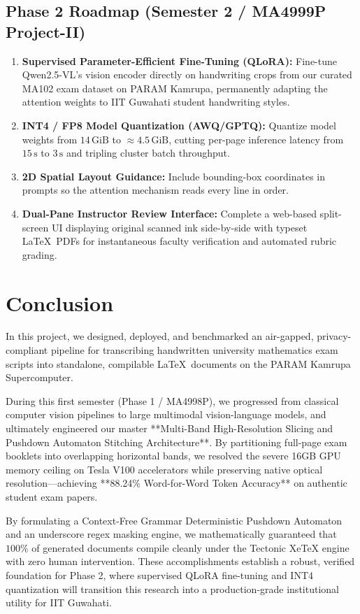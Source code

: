 \subsection{Phase 2 Roadmap (Semester 2 / MA4999P Project-II)}
\begin{enumerate}
    \item \textbf{Supervised Parameter-Efficient Fine-Tuning (QLoRA):} Fine-tune Qwen2.5-VL's vision encoder directly on handwriting crops from our curated MA102 exam dataset on PARAM Kamrupa, permanently adapting the attention weights to IIT Guwahati student handwriting styles.
    \item \textbf{INT4 / FP8 Model Quantization (AWQ/GPTQ):} Quantize model weights from $14\,\text{GiB}$ to $\approx 4.5\,\text{GiB}$, cutting per-page inference latency from $15\,\text{s}$ to $3\,\text{s}$ and tripling cluster batch throughput.
    \item \textbf{2D Spatial Layout Guidance:} Include bounding-box coordinates in prompts so the attention mechanism reads every line in order.
    \item \textbf{Dual-Pane Instructor Review Interface:} Complete a web-based split-screen UI displaying original scanned ink side-by-side with typeset \LaTeX\ PDFs for instantaneous faculty verification and automated rubric grading.
\end{enumerate}

\section{Conclusion}
\label{sec:conclusion}

In this project, we designed, deployed, and benchmarked an air-gapped, privacy-compliant pipeline for transcribing handwritten university mathematics exam scripts into standalone, compilable \LaTeX\ documents on the PARAM Kamrupa Supercomputer.

During this first semester (Phase 1 / MA4998P), we progressed from classical computer vision pipelines to large multimodal vision-language models, and ultimately engineered our master **Multi-Band High-Resolution Slicing and Pushdown Automaton Stitching Architecture**. By partitioning full-page exam booklets into overlapping horizontal bands, we resolved the severe 16GB GPU memory ceiling on Tesla V100 accelerators while preserving native optical resolution—achieving **88.24\% Word-for-Word Token Accuracy** on authentic student exam papers.

By formulating a Context-Free Grammar Deterministic Pushdown Automaton and an underscore regex masking engine, we mathematically guaranteed that $100\%$ of generated documents compile cleanly under the Tectonic XeTeX engine with zero human intervention. These accomplishments establish a robust, verified foundation for Phase 2, where supervised QLoRA fine-tuning and INT4 quantization will transition this research into a production-grade institutional utility for IIT Guwahati.
